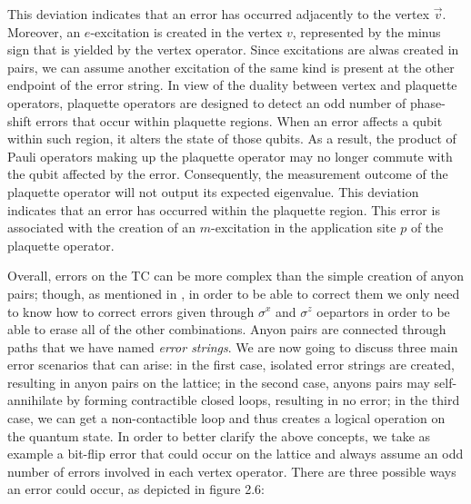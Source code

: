 \documentclass{Configuration_Files/PoliMi3i_thesis}
\begin{document}
This deviation indicates that an error has occurred adjacently to the vertex $\vec{v}$. Moreover, an $e$-excitation is created in the vertex $v$, represented by the minus sign that is yielded by the vertex operator. Since excitations are alwas created in pairs, we can assume another excitation of the same kind is present at the other endpoint of the error string. \newline
In view of the duality between vertex and plaquette operators, plaquette operators are designed to detect an odd number of phase-shift errors that occur within plaquette regions. When an error affects a qubit within such region, it alters the state of those qubits. As a result, the product of Pauli operators making up the plaquette operator may no longer commute with the qubit affected by the error. Consequently, the measurement outcome of the plaquette operator will not output its expected eigenvalue. This deviation indicates that an error has occurred within the plaquette region. This error is associated with the creation of an $m$-excitation in the application site $p$ of the plaquette operator. \newline

Overall, errors on the TC can be more complex than the simple creation of anyon pairs; though, as mentioned in \cite{Kas19,Bro14}, in order to be able to correct them we only need to know how to correct errors given through $\sigma^x$ and $\sigma^z$ oepartors in order to be able to erase all of the other combinations. Anyon pairs are connected through paths that we have named {\it error strings}. We are now going to discuss three main error scenarios that can arise: in the first case, isolated error strings are created, resulting in anyon pairs on the lattice; in the second case, anyons pairs may self-annihilate by forming contractible closed loops, resulting in no error; in the third case, we can get a non-contactible loop and thus creates a logical operation on the quantum state. \newline
In order to better clarify the above concepts, we take as example a bit-flip error that could occur on the lattice and always assume an odd number of errors involved in each vertex operator. There are three possible ways an error could occur, as depicted in figure 2.6: 
\end{document}
